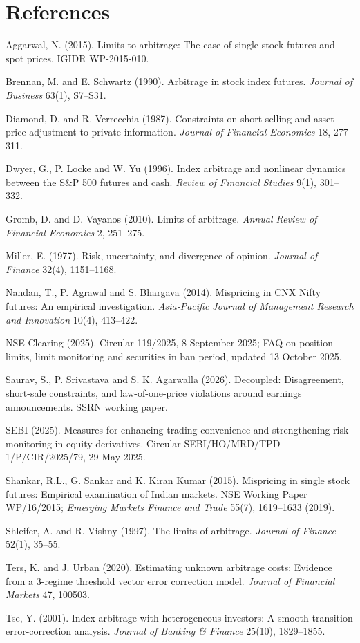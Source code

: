 \documentclass[11pt,a4paper]{article}
\theoremstyle{plain}
\theoremstyle{definition}
\theoremstyle{remark}
\begin{document}
\section*{References}
\small
\begin{description}[leftmargin=1.2em,itemsep=0pt,font=\normalfont]
\item Aggarwal, N. (2015). Limits to arbitrage: The case of single stock futures and spot prices. IGIDR WP-2015-010.
\item Brennan, M. and E. Schwartz (1990). Arbitrage in stock index futures. \emph{Journal of Business} 63(1), S7--S31.
\item Diamond, D. and R. Verrecchia (1987). Constraints on short-selling and asset price adjustment to private information. \emph{Journal of Financial Economics} 18, 277--311.
\item Dwyer, G., P. Locke and W. Yu (1996). Index arbitrage and nonlinear dynamics between the S\&P 500 futures and cash. \emph{Review of Financial Studies} 9(1), 301--332.
\item Gromb, D. and D. Vayanos (2010). Limits of arbitrage. \emph{Annual Review of Financial Economics} 2, 251--275.
\item Miller, E. (1977). Risk, uncertainty, and divergence of opinion. \emph{Journal of Finance} 32(4), 1151--1168.
\item Nandan, T., P. Agrawal and S. Bhargava (2014). Mispricing in CNX Nifty futures: An empirical investigation. \emph{Asia-Pacific Journal of Management Research and Innovation} 10(4), 413--422.
\item NSE Clearing (2025). Circular 119/2025, 8 September 2025; FAQ on position limits, limit monitoring and securities in ban period, updated 13 October 2025.
\item Saurav, S., P. Srivastava and S. K. Agarwalla (2026). Decoupled: Disagreement, short-sale constraints, and law-of-one-price violations around earnings announcements. SSRN working paper.
\item SEBI (2025). Measures for enhancing trading convenience and strengthening risk monitoring in equity derivatives. Circular SEBI/HO/MRD/TPD-1/P/CIR/2025/79, 29 May 2025.
\item Shankar, R.L., G. Sankar and K. Kiran Kumar (2015). Mispricing in single stock futures: Empirical examination of Indian markets. NSE Working Paper WP/16/2015; \emph{Emerging Markets Finance and Trade} 55(7), 1619--1633 (2019).
\item Shleifer, A. and R. Vishny (1997). The limits of arbitrage. \emph{Journal of Finance} 52(1), 35--55.
\item Ters, K. and J. Urban (2020). Estimating unknown arbitrage costs: Evidence from a 3-regime threshold vector error correction model. \emph{Journal of Financial Markets} 47, 100503.
\item Tse, Y. (2001). Index arbitrage with heterogeneous investors: A smooth transition error-correction analysis. \emph{Journal of Banking \& Finance} 25(10), 1829--1855.
\end{description}
\end{document}
